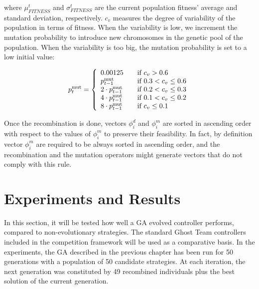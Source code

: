 \documentclass{llncs}
\begin{document}
where $\mu^t_{FITNESS}$ and $\sigma^t_{FITNESS}$ are the current population fitness' average and standard deviation, respectively. $c_v$ measures the degree of variability of the population in terms of fitness. When the variability is low, we increment the mutation probability to introduce new chromosomes in the genetic pool of the population. When the variability is too big, the mutation probability is set to a low initial value:
\begin{small}
\begin{equation}
 p^\mathrm{mut}_t = \left\{
\begin{array}{l l}
	0.00125 & \quad \textrm{if $c_v > 0.6$}\\
	p^\mathrm{mut}_{t-1} & \quad \textrm {if $0.3 < c_v \leq 0.6$}\\
	2 \cdot p^\mathrm{mut}_{t-1} & \quad \textrm {if $0.2 < c_v \leq 0.3$}\\
	4 \cdot p^\mathrm{mut}_{t-1} & \quad \textrm {if $0.1 < c_v \leq 0.2$}\\
	8 \cdot p^\mathrm{mut}_{t-1} & \quad \textrm {if $c_v \leq 0.1$}\\
   \end{array} \right.
\end{equation}
\end{small}
Once the recombination is done, vectors $\phi^d_i$ and $\phi^m_i $ are sorted in ascending order with respect to the values of $\phi^m_i $ to preserve their feasibility. In fact, by definition vector $\phi^m_i $ are required to be always sorted in ascending order, and the recombination and the mutation operators might generate vectors that do not comply with this rule.

%
%

\section{Experiments and Results}
\label{sec:experiments}

In this section, it will be tested how well a GA evolved controller performs, compared to non-evolutionary strategies. The standard Ghost Team controllers included in the competition framework will be used as a comparative basis.  
In the experiments, the GA described in the previous chapter has been
run for 50 generations with a population of 50 candidate 
strategies. At each iteration, the next generation was constituted by
49 recombined individuals plus the best solution of the current
generation. 
\end{document}
